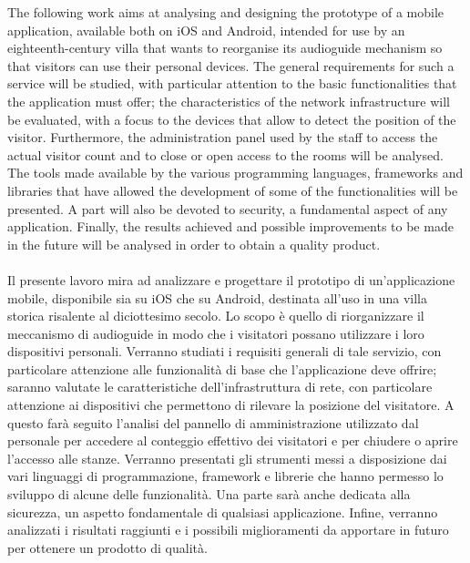 The following work aims at analysing and designing the prototype of a mobile application, available both on iOS and Android, intended for use by an eighteenth-century villa that wants to reorganise its audioguide mechanism so that visitors can use their personal devices.
The general requirements for such a service will be studied, with particular attention to the basic functionalities that the application must offer; the characteristics of the network infrastructure will be evaluated, with a focus to the devices that allow to detect the position of the visitor. Furthermore, the administration panel used by the staff to access the actual visitor count and to close or open access to the rooms will be analysed. The tools made available by the various programming languages, frameworks and libraries that have allowed the development of some of the functionalities will be presented. A part will also be devoted to security, a fundamental aspect of any application. Finally, the results achieved and possible improvements to be made in the future will be analysed in order to obtain a quality product.\\\\
Il presente lavoro mira ad analizzare e progettare il prototipo di un'applicazione mobile, disponibile sia su iOS che su Android, destinata all'uso in una villa storica risalente al diciottesimo secolo. Lo scopo è quello di riorganizzare il meccanismo di audioguide in modo che i visitatori possano utilizzare i loro dispositivi personali.
Verranno studiati i requisiti generali di tale servizio, con particolare attenzione alle funzionalità di base che l'applicazione deve offrire; saranno valutate le caratteristiche dell'infrastruttura di rete, con particolare attenzione ai dispositivi che permettono di rilevare la posizione del visitatore. A questo farà seguito l'analisi del pannello di amministrazione utilizzato dal personale per accedere al conteggio effettivo dei visitatori e per chiudere o aprire l'accesso alle stanze. 
Verranno presentati gli strumenti messi a disposizione dai vari linguaggi di programmazione, framework e librerie che hanno permesso lo sviluppo di alcune delle funzionalità. Una parte sarà anche dedicata alla sicurezza, un aspetto fondamentale di qualsiasi applicazione. Infine, verranno analizzati i risultati raggiunti e i possibili miglioramenti da apportare in futuro per ottenere un prodotto di qualità.
